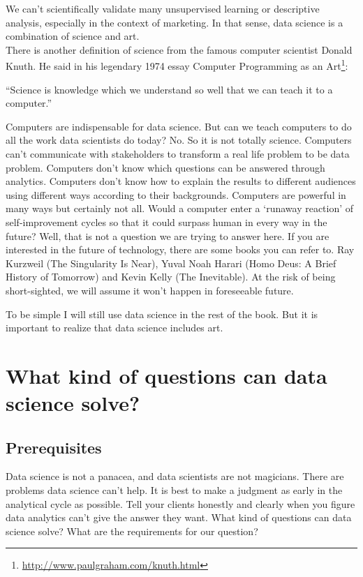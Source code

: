 \documentclass[12pt,]{krantz}
\renewenvironment{quote}{\begin{VF}}{\end{VF}}
\renewcommand{\href}[2]{#2\footnote{\url{#1}}}
\theoremstyle{definition}
\theoremstyle{definition}
\theoremstyle{remark}
\begin{document}
We can't scientifically validate many unsupervised learning or
descriptive analysis, especially in the context of marketing. In that
sense, data science is a combination of science and art.\\
There is another definition of science from the famous computer
scientist Donald Knuth. He said in his legendary 1974 essay
\href{http://www.paulgraham.com/knuth.html}{Computer Programming as an
Art}:

\begin{quote}
``Science is knowledge which we understand so well that we can teach it
to a computer.''
\end{quote}

Computers are indispensable for data science. But can we teach computers
to do all the work data scientists do today? No. So it is not totally
science. Computers can't communicate with stakeholders to transform a
real life problem to be data problem. Computers don't know which
questions can be answered through analytics. Computers don't know how to
explain the results to different audiences using different ways
according to their backgrounds. Computers are powerful in many ways but
certainly not all. Would a computer enter a `runaway reaction' of
self-improvement cycles so that it could surpass human in every way in
the future? Well, that is not a question we are trying to answer here.
If you are interested in the future of technology, there are some books
you can refer to. Ray Kurzweil (The Singularity Is Near), Yuval Noah
Harari (Homo Deus: A Brief History of Tomorrow) and Kevin Kelly (The
Inevitable). At the risk of being short-sighted, we will assume it won't
happen in foreseeable future.

To be simple I will still use data science in the rest of the book. But
it is important to realize that data science includes art.

\section{What kind of questions can data science
solve?}\label{what-kind-of-questions-can-data-science-solve}

\subsection{Prerequisites}\label{prerequisites}

Data science is not a panacea, and data scientists are not magicians.
There are problems data science can't help. It is best to make a
judgment as early in the analytical cycle as possible. Tell your clients
honestly and clearly when you figure data analytics can't give the
answer they want. What kind of questions can data science solve? What
are the requirements for our question?
\end{document}
